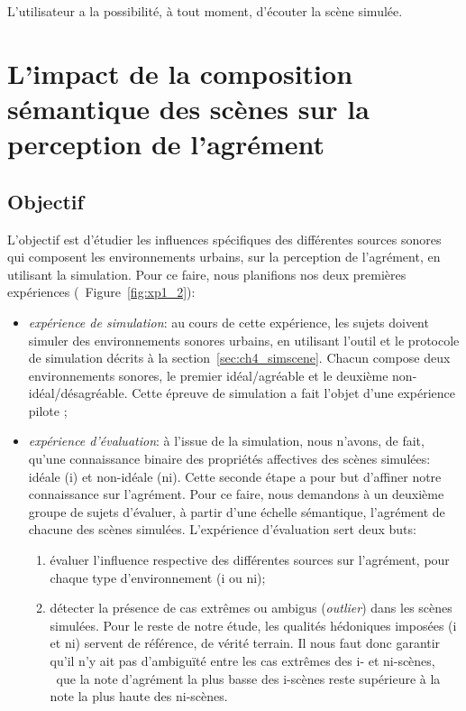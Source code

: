 L'utilisateur a la possibilité, à tout moment, d'écouter la scène simulée.
 

\section[Agrément perçu et composition sémantique]{L'impact de la composition sémantique des scènes sur la perception de l'agrément}
\label{sec:xp1_2}

\subsection{Objectif}

L'objectif est d'étudier les influences spécifiques des différentes sources sonores qui composent les environnements urbains, sur la perception de l'agrément, en utilisant la simulation. Pour ce faire, nous planifions nos deux premières expériences (\cf~Figure~\ref{fig:xp1_2}):

\begin{itemize}
\item \emph{expérience de simulation}: au cours de cette expérience, les sujets doivent simuler des environnements sonores urbains, en utilisant l'outil et le protocole de simulation décrits à la section~\ref{sec:ch4_simscene}. Chacun compose deux environnements sonores, le premier idéal/agréable et le deuxième non-idéal/désagréable. Cette épreuve de simulation a fait l'objet d'une expérience pilote \citep{lafay2013atiam,lafay2014new}; 


\item \emph{expérience d'évaluation}: à l'issue de la simulation, nous n'avons, de fait, qu'une connaissance binaire des propriétés affectives des scènes simulées: idéale (i) et non-idéale (ni). Cette seconde étape a pour but d'affiner notre connaissance sur l'agrément. Pour ce faire, nous demandons à un deuxième groupe de sujets d'évaluer, à partir d'une échelle sémantique, l'agrément de chacune des scènes simulées. L'expérience d'évaluation sert deux buts:

\begin{enumerate}
\item évaluer l'influence respective des différentes sources sur l'agrément, pour chaque type d'environnement (i ou ni);
\item détecter la présence de cas extrêmes ou ambigus (\emph{outlier}) dans les scènes simulées. Pour le reste de notre étude, les qualités hédoniques imposées (i et ni) servent de référence, de vérité terrain. Il nous faut donc garantir qu'il n'y ait pas d’ambiguïté entre les cas extrêmes des i- et ni-scènes, \ie~que la note d'agrément la plus basse des i-scènes reste supérieure à la note la plus haute des ni-scènes.
\end{enumerate}

\end{itemize}

